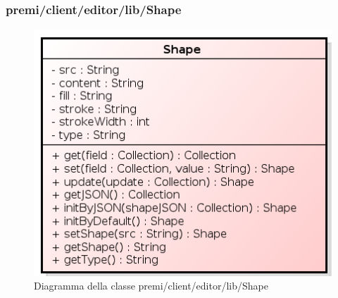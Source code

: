 \subsubsection{premi/client/editor/lib/Shape}
\begin{figure}[H]
\begin{center}
\includegraphics[scale=0.80]{img/diacla/shape.png}
\caption{Diagramma della classe premi/client/editor/lib/Shape}
\end{center}
\end{figure}

